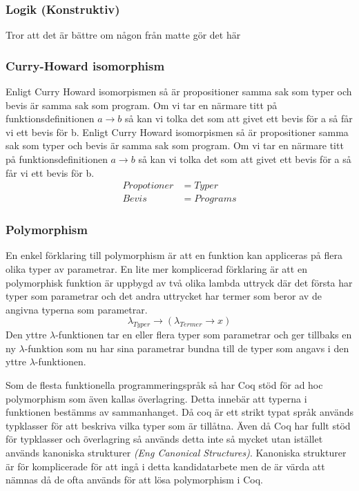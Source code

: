\subsubsection{Logik (Konstruktiv)}
Tror att det är bättre om någon från matte gör det här

\subsubsection{Curry-Howard isomorphism}
Enligt Curry Howard isomorpismen så är propositioner samma sak som typer och
bevis är samma sak som program. Om vi tar en närmare titt på
funktionsdefinitionen $a \rightarrow b$ så kan vi tolka det som att givet ett
bevis för a så får vi ett bevis för b.
Enligt Curry Howard isomorpismen så är propositioner samma sak som typer och
bevis är samma sak som program. Om vi tar en närmare titt på
funktionsdefinitionen $a \rightarrow b$ så kan vi tolka det som att givet ett
bevis för a så får vi ett bevis för b.
\begin{align*}
Propotioner &= Typer \\
Bevis &= Programs
\end{align*}

\subsubsection{Polymorphism}
En enkel förklaring till polymorphism är att en funktion kan appliceras på
flera olika typer av parametrar.
En lite mer komplicerad förklaring är att en polymorphisk funktion är uppbygd av
två olika lambda uttryck där det första har typer som parametrar och det andra
uttrycket har termer som beror av de angivna typerna som parametrar.
\begin{equation}
  \lambda_{Typer} \rightarrow (\lambda_{Termer} \rightarrow x)
  \label{polymorphsk funktion}
\end{equation}
Den yttre $\lambda$-funktionen tar en eller flera typer som parametrar och ger
tillbaks en ny $\lambda$-funktion som nu har sina parametrar bundna till de
typer som angavs i den yttre $\lambda$-funktionen.

Som de flesta funktionella programmeringspråk så har Coq stöd för ad hoc
polymorphism som även kallas överlagring. Detta innebär att typerna i
funktionen bestämms av sammanhanget. Då coq är ett strikt typat språk används
typklasser för att beskriva vilka typer som är tillåtna.
Även då Coq har fullt stöd för typklasser och överlagring så används detta inte
så mycket utan istället används kanoniska strukturer {\it (Eng Canonical
Structures)}. Kanoniska strukturer är för komplicerade för att ingå i detta
kandidatarbete men de är värda att nämnas då de ofta används för att lösa
polymorphism i Coq.

